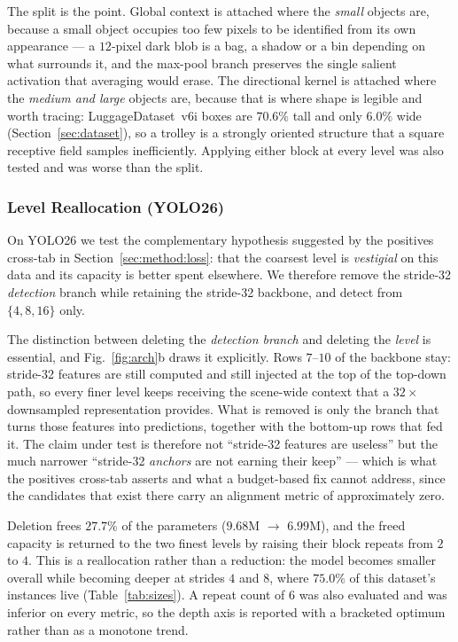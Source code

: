 \documentclass[10pt,twocolumn,a4paper]{article}
\begin{document}
The split is the point. Global context is attached where the \emph{small}
objects are, because a small object occupies too few pixels to be identified
from its own appearance --- a $12$-pixel dark blob is a bag, a shadow or a bin
depending on what surrounds it, and the max-pool branch preserves the single
salient activation that averaging would erase. The directional kernel is
attached where the \emph{medium and large} objects are, because that is where
shape is legible and worth tracing: LuggageDataset~v6i boxes are $70.6\%$ tall
and only $6.0\%$ wide (Section~\ref{sec:dataset}), so a trolley is a strongly
oriented structure that a square receptive field samples inefficiently. Applying
either block at every level was also tested and was worse than the split.

\subsubsection{Level Reallocation (YOLO26)}

On YOLO26 we test the complementary hypothesis suggested by the positives
cross-tab in Section~\ref{sec:method:loss}: that the coarsest level is
\emph{vestigial} on this data and its capacity is better spent elsewhere. We
therefore remove the stride-32 \emph{detection} branch while retaining the
stride-32 backbone, and detect from $\{4,8,16\}$ only.

The distinction between deleting the \emph{detection branch} and deleting the
\emph{level} is essential, and Fig.~\ref{fig:arch}b draws it explicitly. Rows
$7$--$10$ of the backbone stay: stride-32 features are still computed and still
injected at the top of the top-down path, so every finer level keeps receiving
the scene-wide context that a $32\times$ downsampled representation provides.
What is removed is only the branch that turns those features into predictions,
together with the bottom-up rows that fed it. The claim under test is therefore
not ``stride-32 features are useless'' but the much narrower ``stride-32
\emph{anchors} are not earning their keep'' --- which is what the positives
cross-tab asserts and what a budget-based fix cannot address, since the
candidates that exist there carry an alignment metric of approximately zero.

Deletion frees $27.7\%$ of the parameters ($9.68$M $\rightarrow$ $6.99$M), and
the freed capacity is returned to the two finest levels by raising their block
repeats from $2$ to $4$. This is a reallocation rather than a reduction: the
model becomes smaller overall while becoming deeper at strides $4$ and $8$,
where $75.0\%$ of this dataset's instances live (Table~\ref{tab:sizes}). A repeat count of $6$ was also
evaluated and was inferior on every metric, so the depth axis is reported with a
bracketed optimum rather than as a monotone trend.
\end{document}
